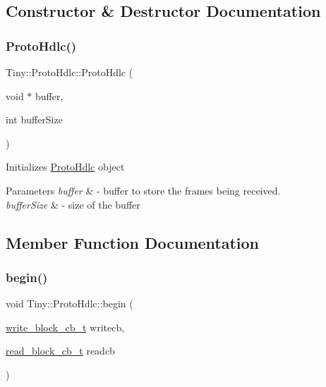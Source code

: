 \subsection{Constructor \& Destructor Documentation}
\mbox{\label{classTiny_1_1ProtoHdlc_a82160439269af053f034d69a1b350cbc}} 
\subsubsection{\texorpdfstring{Proto\+Hdlc()}{ProtoHdlc()}}
{\footnotesize\ttfamily Tiny\+::\+Proto\+Hdlc\+::\+Proto\+Hdlc (\begin{DoxyParamCaption}\item[{void $\ast$}]{buffer,  }\item[{int}]{buffer\+Size }\end{DoxyParamCaption})\hspace{0.3cm}{\ttfamily [inline]}}

Initializes \hyperlink{classTiny_1_1ProtoHdlc}{Proto\+Hdlc} object 
\begin{DoxyParams}{Parameters}
{\em buffer} & -\/ buffer to store the frames being received. \\
\hline
{\em buffer\+Size} & -\/ size of the buffer \\
\hline
\end{DoxyParams}


\subsection{Member Function Documentation}
\mbox{\label{classTiny_1_1ProtoHdlc_acdc849f66b9f9a51d8930552ade56324}} 
\subsubsection{\texorpdfstring{begin()}{begin()}\hspace{0.1cm}{\footnotesize\ttfamily [1/2]}}
{\footnotesize\ttfamily void Tiny\+::\+Proto\+Hdlc\+::begin (\begin{DoxyParamCaption}\item[{\hyperlink{tiny__types_8h_aafd634660bba76cace57a8f9b01e044d}{write\+\_\+block\+\_\+cb\+\_\+t}}]{writecb,  }\item[{\hyperlink{tiny__types_8h_a15bec127d9ee63658563d62e92b5261b}{read\+\_\+block\+\_\+cb\+\_\+t}}]{readcb }\end{DoxyParamCaption})}

